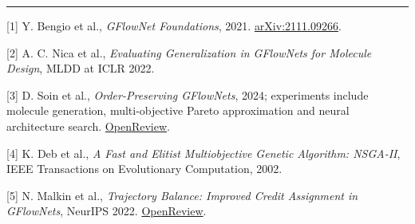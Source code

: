 \documentclass[10pt,a4paper]{article}
\newcommand{\rsection}[1]{\vspace{4pt}{\large\bfseries\textcolor{accent}{#1}}\par\vspace{-2pt}\textcolor{muted}{\rule{\textwidth}{0.5pt}}}
\begin{document}

\rsection{Selected references}

\small
{[1]} Y. Bengio et al., \emph{GFlowNet Foundations}, 2021. \href{https://arxiv.org/abs/2111.09266}{arXiv:2111.09266}.\par
{[2]} A. C. Nica et al., \emph{Evaluating Generalization in GFlowNets for Molecule Design}, MLDD at ICLR 2022.\par
{[3]} D. Soin et al., \emph{Order-Preserving GFlowNets}, 2024; experiments include molecule generation, multi-objective Pareto approximation and neural architecture search. \href{https://openreview.net/forum?id=VXDPXuq4oG}{OpenReview}.\par
{[4]} K. Deb et al., \emph{A Fast and Elitist Multiobjective Genetic Algorithm: NSGA-II}, IEEE Transactions on Evolutionary Computation, 2002.\par
{[5]} N. Malkin et al., \emph{Trajectory Balance: Improved Credit Assignment in GFlowNets}, NeurIPS 2022. \href{https://openreview.net/forum?id=5btWTw1vcw1}{OpenReview}.
\end{document}
